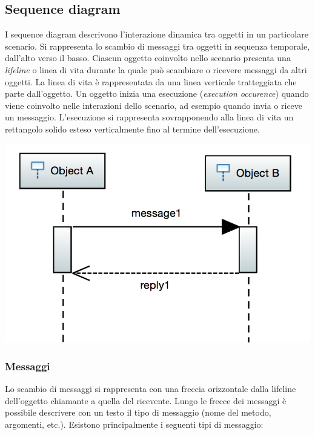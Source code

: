 \documentclass{article}
\begin{document}
\subsection{Sequence diagram}

I sequence diagram descrivono l'interazione dinamica tra oggetti in un particolare scenario. Si rappresenta lo scambio di messaggi tra oggetti in sequenza temporale, dall'alto verso il basso. Ciascun oggetto coinvolto nello scenario presenta una \textit{lifeline} o linea di vita durante la quale pu\`o scambiare o ricevere messaggi da altri oggetti. La linea di vita  \`e rappresentata da una linea verticale tratteggiata che parte dall'oggetto. Un oggetto inizia una esecuzione (\textit{execution occurence}) quando viene coinvolto nelle interazioni dello scenario, ad esempio quando invia o riceve un messaggio. L'esecuzione si rappresenta sovrapponendo alla linea di vita un rettangolo solido esteso verticalmente fino al termine dell'esecuzione.


\begin{center}
\includegraphics[scale=0.4]{seq-simple.png}\\
\end{center}


\subsubsection{Messaggi}

Lo scambio di messaggi si rappresenta con una freccia orizzontale dalla lifeline dell'oggetto chiamante a quella del ricevente. Lungo le frecce dei messaggi \`e possibile descrivere con un testo il tipo di messaggio (nome del metodo, argomenti, etc.). Esistono principalmente i seguenti tipi di messaggio:
\end{document}
